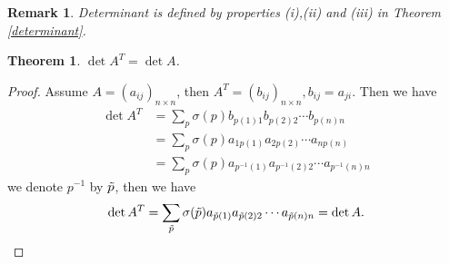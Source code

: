 \documentclass[11pt]{book}
\newtheorem{theorem}{Theorem}[section]
\newtheorem{remark}{Remark}[section]
\theoremstyle{definition}
\numberwithin{equation}{subsection}
\begin{document}
\begin{remark}
Determinant is defined by properties (i),(ii) and (iii) in Theorem \ref{determinant}.
\end{remark}

\medskip

\begin{theorem}
$\det A^T = \det A$.
\end{theorem}
\begin{proof}
Assume $A = (a_{ij})_{n\times n}$, then $A^T = (b_{ij})_{n\times n}, b_{ij} = a_{ji}$. Then we have 
\begin{align*}
    \det A^T & = \sum_p \sigma(p) b_{p(1)1} b_{p(2)2} \cdots b_{p(n)n} \\
    & = \sum_p \sigma(p) a_{1 p(1)} a_{2 p(2)} \cdots a_{n p(n)} \\
    & = \sum_p \sigma(p) a_{p^{-1}(1)} a_{p^{-1}(2) 2} \cdots a_{p^{-1}(n) n}
\end{align*}
we denote $p^{-1}$ by $\Tilde{p}$, then we have
\begin{align*}
    \det A^T = \sum_{\Tilde{p}} \sigma(\Tilde{p}) a_{\Tilde{p}(1)} a_{\Tilde{p}(2) 2} \cdots a_{\Tilde{p}(n) n} = \det A.
\end{align*}
\end{proof}

\medskip
\end{document}
